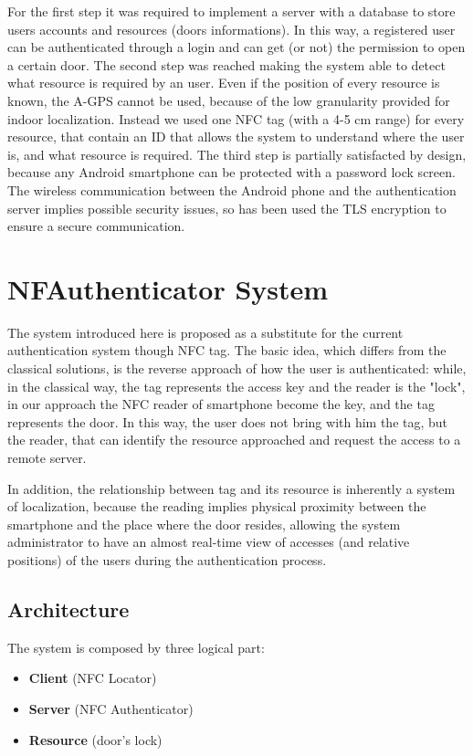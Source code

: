 \documentclass[conference]{IEEEtran}
\begin{document}
For the first step it was required to implement a server with a database to store users accounts and resources (doors informations). In this way, a registered user can be authenticated through a login and can get (or not) the permission to open a certain door.
The second step was reached making the system able to detect what resource is required by an user. Even if the position of every resource is known, the A-GPS cannot be used, because of the low granularity provided for indoor localization. Instead we used one NFC tag (with a 4-5 cm range) for every resource, that contain an ID that allows the system to understand where the user is, and what resource is required.
The third step is partially satisfacted by design, because any Android smartphone can be protected with a password lock screen. The wireless communication between the Android phone and the authentication server implies possible security issues, so has been used the TLS encryption to ensure a secure communication.

\section{NFAuthenticator System}
The system introduced here is proposed as a substitute for the current authentication system though NFC tag. The basic idea, which differs from the classical solutions, is the reverse approach of how the user is authenticated: while, in the classical way, the tag represents the access key and the reader is the "lock", in our approach the NFC reader of smartphone become the key, and the tag represents the door. In this way, the user does not bring with him the tag, but the reader, that can identify the resource approached and request the access to a remote server.

In addition, the relationship between tag and its resource is inherently a system of localization, because the reading implies physical proximity between the smartphone and the place where the door resides, allowing the system administrator to have an almost real-time view of accesses (and relative positions) of the users during the authentication process.

\subsection{Architecture}
The system is composed by three logical part:
\begin{itemize}
 \item \textbf{Client} (NFC Locator)
 \item \textbf{Server} (NFC Authenticator)
 \item \textbf{Resource} (door’s lock)
\end{itemize}
\end{document}
